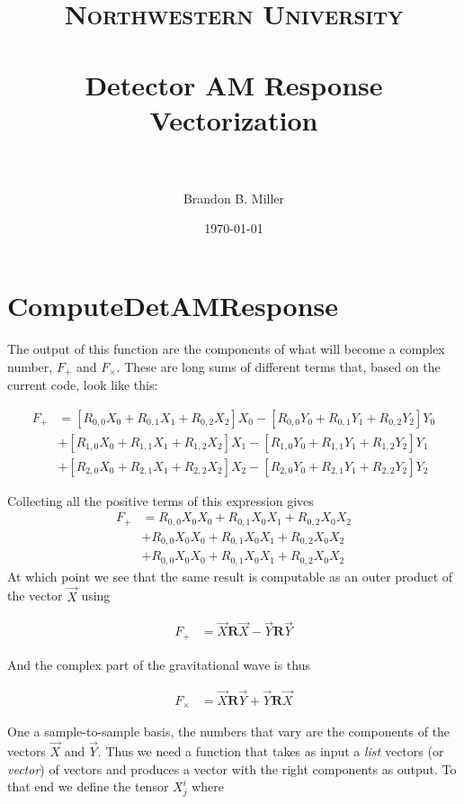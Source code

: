 \documentclass[paper=a4, fontsize=11pt]{scrartcl} %
\title{	
\normalfont \normalsize 
\textsc{Northwestern University} \\ [25pt] %
\horrule{0.5pt} \\[0.4cm] %
\huge Detector AM Response Vectorization \\ %
\horrule{2pt} \\[0.5cm] %
}
\author{Brandon B. Miller} %
\date{\normalsize\today} %
\numberwithin{equation}{section} %
\numberwithin{figure}{section} %
\numberwithin{table}{section} %
\begin{document}
\maketitle %

\section{ComputeDetAMResponse}
The output of this function are the components of what will become a complex number, $F_{+}$ and $F_{\times}$. These are long sums of different terms that, based on the current code, look like this:

\begin{align}
F_{+} &= [R_{0,0}X_0 + R_{0,1}X_1 + R_{0,2}X_2]X_0 - [R_{0,0}Y_0 + R_{0,1}Y_1 + R_{0,2}Y_2]Y_0 \\
&+ [R_{1,0}X_0 + R_{1,1}X_1 + R_{1,2}X_2]X_1 - [R_{1,0}Y_0 + R_{1,1}Y_1 + R_{1,2}Y_2]Y_1 \\
&+ [R_{2,0}X_0 + R_{2,1}X_1 + R_{2,2}X_2]X_2 - [R_{2,0}Y_0 + R_{2,1}Y_1 + R_{2,2}Y_2]Y_2
\end{align}

Collecting all the positive terms of this expression gives
\begin{align}
F_{+} &= R_{0,0}X_0X_0 + R_{0,1}X_0X_1 + R_{0,2}X_0X_2 \\
&+ R_{0,0}X_0X_0 + R_{0,1}X_0X_1 + R_{0,2}X_0X_2 \\ 
&+ R_{0,0}X_0X_0 + R_{0,1}X_0X_1 + R_{0,2}X_0X_2 
\end{align}
At which point we see that the same result is computable as an outer product of the vector $\vec{X}$ using

\begin{align}
F_{+} &= \vec{X}\mathbf{R}\vec{X} - \vec{Y}\mathbf{R}\vec{Y}
\end{align}

And the complex part of the gravitational wave is thus

\begin{align}
F_{\times} &= \vec{X}\mathbf{R}\vec{Y} + \vec{Y}\mathbf{R}\vec{X}
\end{align}

One a sample-to-sample basis, the numbers that vary are the components of the vectors $\vec{X}$ and $\vec{Y}$. Thus we need a function that takes as input a \textit{list} vectors (or \textit{vector}) of vectors and produces a vector with the right components as output. To that end we define the tensor $X^{i}_{j}$ where 
\end{document}
